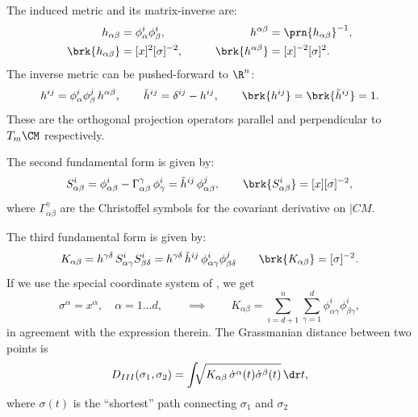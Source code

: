 \documentclass[12pt]{article}
\newcommand{\inv}{^{-1}}
\newcommand{\invsq}{^{-2}}
\begin{document}
The induced metric and its matrix-inverse are:
%
\begin{equation}\label{eq:inducedmet}
\begin{aligned}
  h_{\alpha\beta} &= \phi^i_\alpha \phi^i_\beta, \qquad&
  h^{\alpha\beta} &= \prn{h_{\alpha\beta}}\inv, \\
  \brk{h_{\alpha\beta}} &= [x]^2[\sigma]\invsq, \qquad&
  \brk{h^{\alpha\beta}} &= [x]\invsq[\sigma]^2. \\
\end{aligned}
\end{equation}
%
The inverse metric can be pushed-forward to $\R^n$:
%
\begin{equation}\label{eq:proj}
  h^{ij} = \phi^i_\alpha \phi^j_\beta \, h^{\alpha\beta}, \qquad
  \tilde{h}^{ij} = \delta^{ij} - h^{ij}, \qquad
  \brk{h^{ij}} = \brk{ \tilde{h}^{ij}} = 1.
\end{equation}
%
These are the orthogonal projection operators parallel and perpendicular to $T_m\CM$ respectively.

The second fundamental form is given by:
%
\begin{equation}\label{eq:extcurvtensor}
  S^i_{\alpha\beta} = \phi^i_{\alpha\beta} - \Gamma^\gamma_{\alpha\beta} \, \phi^i_\gamma
                    = \tilde{h}^{ij} \, \phi^j_{\alpha\beta},
  \qquad
  \brk{S^i_{\alpha\beta}} = [x][\sigma]\invsq,
\end{equation}
%
where $\Gamma^\gamma_{\alpha\beta}$ are the Christoffel symbols for the covariant derivative on $|CM$.

The third fundamental form is given by:
%
\begin{equation}\label{eq:grassmet}
  K_{\alpha\beta} = h^{\gamma\delta} \,  S^i_{\alpha\gamma} S^i_{\beta\delta}
                  = h^{\gamma\delta} \, \tilde{h}^{ij} \, \phi^i_{\alpha\gamma} \phi^j_{\beta\delta}
  \qquad
  \brk{K_{\alpha\beta}}=[\sigma]\invsq.
\end{equation}
%
If we use the special coordinate system of \cite[Appendix B]{clarkson2008tighter}, we get
%
\begin{equation}\label{eq:specialcoord}
  \sigma^\alpha = x^\alpha, \quad \alpha=1\ldots d,
  \qquad \implies \qquad
  K_{\alpha\beta} = \sum_{i=d+1}^n \sum_{\gamma=1}^d \phi^i_{\alpha\gamma} \phi^i_{\beta\gamma},
\end{equation}
%
in agreement with the expression therein.
The Grassmanian distance between two points is
%
\begin{equation}\label{eq:grass_dist_explicit}
  D_{III}(\sigma_1,\sigma_2) = \int\!\!\! \sqrt{K_{\alpha\beta} \, \dot{\sigma}^\alpha(t)\dot{\sigma}^\beta(t)}\, \dr t,
\end{equation}
%
where $\sigma(t)$ is the ``shortest'' path connecting $\sigma_1$ and $\sigma_2$
\end{document}

